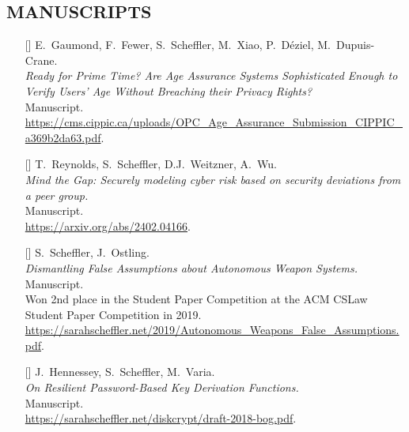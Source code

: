 \documentclass{res}
\begin{document}
\begin{resume}
\section{MANUSCRIPTS}
\vspace{0.25in}

\edef\ageVerifPrimeTime{[\arabic{citctr}]}
\edef\scramDeviations{[\arabic{citctr}]}
\edef\autonomousWeapons{[\arabic{citctr}]}
\edef\bog{[\arabic{citctr}]}

\begin{itemize}
\item[\ageVerifPrimeTime] E.~Gaumond, F.~Fewer, S.~Scheffler, M.~Xiao, P.~D\'eziel, M.~Dupuis-Crane. \\
\emph{Ready for Prime Time? Are Age Assurance Systems Sophisticated Enough to Verify Users' Age Without Breaching their Privacy Rights?} \\
Manuscript.  \\
\url{https://cms.cippic.ca/uploads/OPC_Age_Assurance_Submission_CIPPIC_a369b2da63.pdf}.

\item[\scramDeviations] T.~Reynolds, S.~Scheffler, D.J.~Weitzner, A.~Wu. \\
\emph{Mind the Gap: Securely modeling cyber risk based on security deviations from a peer group.} \\
Manuscript.  \\
\url{https://arxiv.org/abs/2402.04166}.

\item[\autonomousWeapons] S.~Scheffler, J.~Ostling. \\
\emph{Dismantling False Assumptions about Autonomous Weapon Systems.} \\
Manuscript.  \\
Won 2nd place in the Student Paper Competition at the ACM CSLaw Student Paper Competition in 2019. \\
\url{https://sarahscheffler.net/2019/Autonomous_Weapons_False_Assumptions.pdf}.

\item[\bog] J.~Hennessey, S.~Scheffler, M.~Varia. \\
\emph{On Resilient Password-Based Key Derivation Functions.} \\
Manuscript.  \\
\url{https://sarahscheffler.net/diskcrypt/draft-2018-bog.pdf}.
\end{itemize}





\end{resume}
\end{document}
